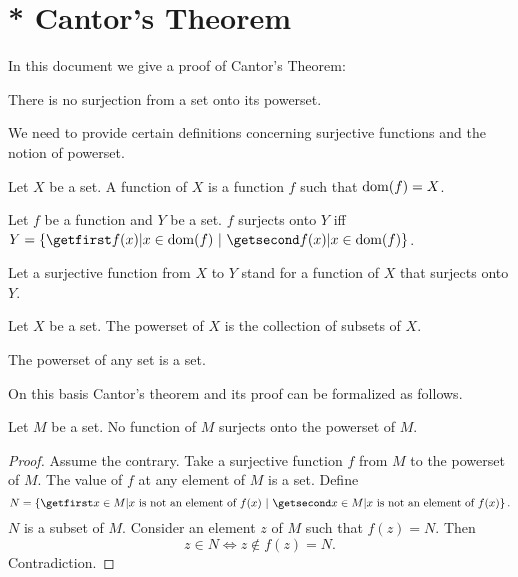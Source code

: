\documentclass{article}
\begin{document}
\section{* Cantor's Theorem}

In this document we give a proof of Cantor's Theorem:

  \begin{theorem*}
    There is no surjection from a set onto its powerset.
  \end{theorem*}

  We need to provide certain definitions concerning surjective
  functions and the notion of powerset.

    \begin{definition*}
      Let $X$ be a set.
      A function of $X$ is a function $f$ such that $\operatorname{dom}(f) = X$.
    \end{definition*}

    \begin{definition*}
      Let $f$ be a function and $Y$ be a set.
      $f$ surjects onto $Y$ iff $Y = \class{f(x) | x \in \dom(f)}$.
    \end{definition*}

    Let a surjective function from $X$ to $Y$ stand for a function of $X$ that
    surjects onto $Y$.

    \begin{definition*}
      Let $X$ be a set.
      The powerset of $X$ is the collection of subsets of $X$.
    \end{definition*}

    \begin{axiom*}
      The powerset of any set is a set.
    \end{axiom*}

  On this basis Cantor's theorem and its proof can be formalized as follows.

    \begin{theorem*}[Cantor]
      Let $M$ be a set.
      No function of $M$ surjects onto the powerset of $M$.
    \end{theorem*}
    \begin{proof}
      Assume the contrary.
      Take a surjective function $f$ from $M$ to the powerset of $M$.
      The value of $f$ at any element of $M$ is a set.
      Define \[ N = \class{x \in M | \text{$x$ is not an element of $f(x)$}}. \]
      $N$ is a subset of $M$.
      Consider an element $z$ of $M$ such that $f(z) = N$.
      Then \[ z \in N \iff z \notin f(z) = N. \]
      Contradiction.
    \end{proof}
\end{document}
